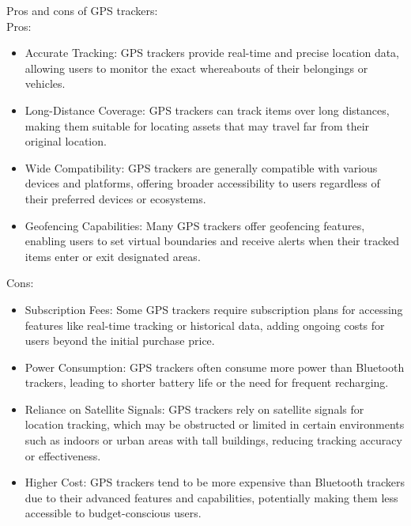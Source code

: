 Pros and cons of \ac{GPS} trackers:\\
Pros:
\begin{itemize}
  \item Accurate Tracking: \ac{GPS} trackers provide real-time and precise location data, allowing users to monitor the exact whereabouts of their belongings or vehicles.
  \item Long-Distance Coverage: \ac{GPS} trackers can track items over long distances, making them suitable for locating assets that may travel far from their original location.
  \item Wide Compatibility: \ac{GPS} trackers are generally compatible with various devices and platforms, offering broader accessibility to users regardless of their preferred devices or ecosystems.
  \item Geofencing Capabilities: Many \ac{GPS} trackers offer geofencing features, enabling users to set virtual boundaries and receive alerts when their tracked items enter or exit designated areas.
\end{itemize}

Cons:
\begin{itemize}
  \item Subscription Fees: Some \ac{GPS} trackers require subscription plans for accessing features like real-time tracking or historical data, adding ongoing costs for users beyond the initial purchase price.
  \item Power Consumption: \ac{GPS} trackers often consume more power than Bluetooth trackers, leading to shorter battery life or the need for frequent recharging.
  \item Reliance on Satellite Signals: \ac{GPS} trackers rely on satellite signals for location tracking, which may be obstructed or limited in certain environments such as indoors or urban areas with tall buildings, reducing tracking accuracy or effectiveness.
  \item Higher Cost: \ac{GPS} trackers tend to be more expensive than Bluetooth trackers due to their advanced features and capabilities, potentially making them less accessible to budget-conscious users.
\end{itemize}

